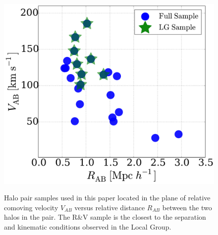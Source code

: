 \documentclass{emulateapj}
\begin{document}
\begin{figure}
\centering
\includegraphics[width=\hsize]{v_r_pairs.pdf}\\
\caption{Halo pair samples used in this paper located in the
  plane of relative comoving velocity $V_{AB}$ versus relative
  distance $R_{AB}$ between the two halos in the pair.
  The R\&V sample is the closest to the separation and kinematic
  conditions observed in the Local Group.} 
\label{fig:samples}
\end{figure}

\end{document}
